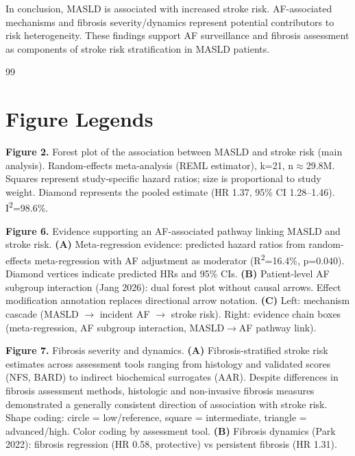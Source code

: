 \documentclass[12pt,a4paper]{article}
\begin{document}
In conclusion, MASLD is associated with increased stroke risk. AF-associated mechanisms and fibrosis severity/dynamics represent potential contributors to risk heterogeneity. These findings support AF surveillance and fibrosis assessment as components of stroke risk stratification in MASLD patients.

\newpage
\begin{thebibliography}{99}


\end{thebibliography}

\newpage
\section*{Figure Legends}

\textbf{Figure 2.} Forest plot of the association between MASLD and stroke risk (main analysis). Random-effects meta-analysis (REML estimator), k=21, n$\approx$29.8M. Squares represent study-specific hazard ratios; size is proportional to study weight. Diamond represents the pooled estimate (HR 1.37, 95\% CI 1.28--1.46). I\textsuperscript{2}=98.6\%.

\textbf{Figure 6.} Evidence supporting an AF-associated pathway linking MASLD and stroke risk. \textbf{(A)} Meta-regression evidence: predicted hazard ratios from random-effects meta-regression with AF adjustment as moderator (R\textsuperscript{2}=16.4\%, p=0.040). Diamond vertices indicate predicted HRs and 95\% CIs. \textbf{(B)} Patient-level AF subgroup interaction (Jang 2026): dual forest plot without causal arrows. Effect modification annotation replaces directional arrow notation. \textbf{(C)} Left: mechanism cascade (MASLD $\rightarrow$ incident AF $\rightarrow$ stroke risk). Right: evidence chain boxes (meta-regression, AF subgroup interaction, MASLD$\rightarrow$AF pathway link).

\textbf{Figure 7.} Fibrosis severity and dynamics. \textbf{(A)} Fibrosis-stratified stroke risk estimates across assessment tools ranging from histology and validated scores (NFS, BARD) to indirect biochemical surrogates (AAR). Despite differences in fibrosis assessment methods, histologic and non-invasive fibrosis measures demonstrated a generally consistent direction of association with stroke risk. Shape coding: circle = low/reference, square = intermediate, triangle = advanced/high. Color coding by assessment tool. \textbf{(B)} Fibrosis dynamics (Park 2022): fibrosis regression (HR 0.58, protective) vs persistent fibrosis (HR 1.31).
\end{document}
